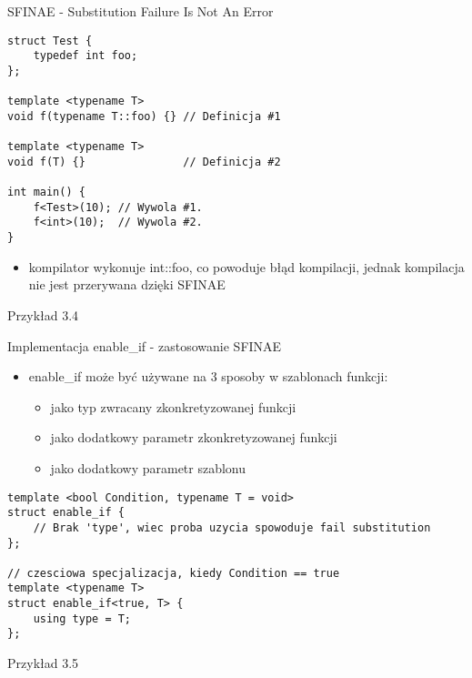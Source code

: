 \documentclass[11pt]{beamer}
\begin{document}
\begin{frame}[fragile]{SFINAE - Substitution Failure Is Not An Error}
    \begin{lstlisting}[frame=single,basicstyle=\tiny]
struct Test {
    typedef int foo;
};

template <typename T> 
void f(typename T::foo) {} // Definicja #1

template <typename T> 
void f(T) {}               // Definicja #2

int main() {
    f<Test>(10); // Wywola #1.
    f<int>(10);  // Wywola #2.
}
    \end{lstlisting}
    
    \begin{itemize}
     \item kompilator wykonuje int::foo, co powoduje błąd kompilacji, jednak kompilacja nie jest przerywana dzięki SFINAE
    \end{itemize}

    \alert{Przykład 3.4}
\end{frame}

\begin{frame}[fragile]{Implementacja enable\_if - zastosowanie SFINAE}
    \begin{itemize}
        \item enable\_if może być używane na 3 sposoby w szablonach funkcji:
        \begin{itemize}
            \item jako typ zwracany zkonkretyzowanej funkcji
            \item jako dodatkowy parametr zkonkretyzowanej funkcji
            \item jako dodatkowy parametr szablonu
        \end{itemize} 
    \end{itemize}


    \begin{lstlisting}[frame=single,basicstyle=\tiny]
template <bool Condition, typename T = void>
struct enable_if {
    // Brak 'type', wiec proba uzycia spowoduje fail substitution
};

// czesciowa specjalizacja, kiedy Condition == true
template <typename T>
struct enable_if<true, T> {
    using type = T;
};
    \end{lstlisting}

    \alert{Przykład 3.5}
\end{frame}
\end{document}
